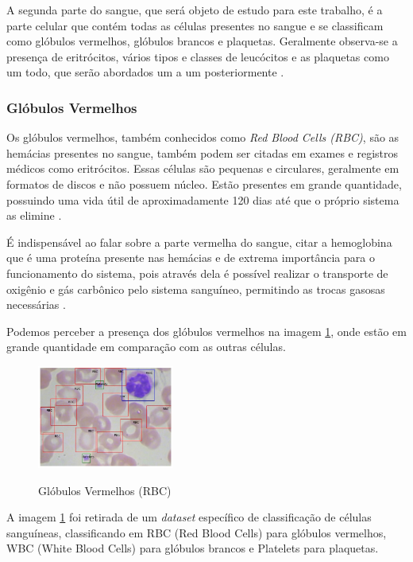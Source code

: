 A segunda parte do sangue, que será objeto de estudo para este trabalho, é a parte celular que contém todas as células presentes no sangue e se classificam como glóbulos vermelhos, glóbulos brancos e plaquetas. Geralmente observa-se a presença de eritrócitos, vários tipos e classes de leucócitos e as plaquetas como um todo, que serão abordados um a um posteriormente \cite{manualHematologia}.

\subsubsection{Glóbulos Vermelhos}
Os glóbulos vermelhos, também conhecidos como \emph{Red Blood Cells (RBC)}, são as hemácias presentes no sangue, também podem ser citadas em exames e registros médicos como eritrócitos. Essas células são pequenas e circulares, geralmente em formatos de discos e não possuem núcleo. Estão presentes em grande quantidade, possuindo uma vida útil de aproximadamente 120 dias até que o próprio sistema as elimine \cite{manualHematologia}.

É indispensável ao falar sobre a parte vermelha do sangue, citar a hemoglobina que é uma proteína presente nas hemácias e de extrema importância para o funcionamento do sistema, pois através dela é possível realizar o transporte de oxigênio e gás carbônico pelo sistema sanguíneo, permitindo as trocas gasosas necessárias \cite{manualHematologia}.

Podemos perceber a presença dos glóbulos vermelhos na imagem \ref{fig:rbc}, onde estão em grande quantidade em comparação com as outras células. 

\begin{figure}[!htb]
	\centering
	\caption{Glóbulos Vermelhos (RBC)}
	\includegraphics[width=0.40\textwidth]{img/rbc.jpg}
	\label{fig:rbc}
\end{figure}

A imagem \ref{fig:rbc} foi retirada de um \emph{dataset} específico de classificação de células sanguíneas, classificando em RBC (Red Blood Cells) para glóbulos vermelhos, WBC (White Blood Cells) para glóbulos brancos e Platelets para plaquetas.
 
